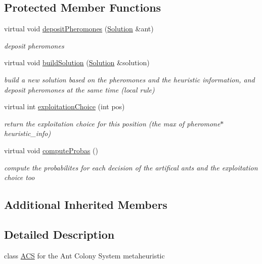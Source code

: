 \subsection*{Protected Member Functions}
\begin{DoxyCompactItemize}
\item 
virtual void \hyperlink{classACS_a13f9aa561242377d593f9ca5a8195715}{deposit\+Pheromones} (\hyperlink{classSolution}{Solution} \&ant)
\begin{DoxyCompactList}\small\item\em deposit pheromones \end{DoxyCompactList}\item 
virtual void \hyperlink{classACS_a934d186f6ad6b61e460722379fdf13f2}{build\+Solution} (\hyperlink{classSolution}{Solution} \&solution)
\begin{DoxyCompactList}\small\item\em build a new solution based on the pheromones and the heuristic information, and deposit pheromones at the same time (local rule) \end{DoxyCompactList}\item 
virtual int \hyperlink{classACS_ae491107fa874323259c4d6a5a65a5eb4}{exploitation\+Choice} (int pos)
\begin{DoxyCompactList}\small\item\em return the exploitation choice for this position (the max of pheromone$\ast$heuristic\+\_\+info) \end{DoxyCompactList}\item 
virtual void \hyperlink{classACS_ab6e89d95b796c69404be787a314ce27d}{compute\+Probas} ()\hypertarget{classACS_ab6e89d95b796c69404be787a314ce27d}{}\label{classACS_ab6e89d95b796c69404be787a314ce27d}

\begin{DoxyCompactList}\small\item\em compute the probabilites for each decision of the artifical ants and the exploitation choice too \end{DoxyCompactList}\end{DoxyCompactItemize}
\subsection*{Additional Inherited Members}


\subsection{Detailed Description}
class \hyperlink{classACS}{A\+CS} for the Ant Colony System metaheuristic 

